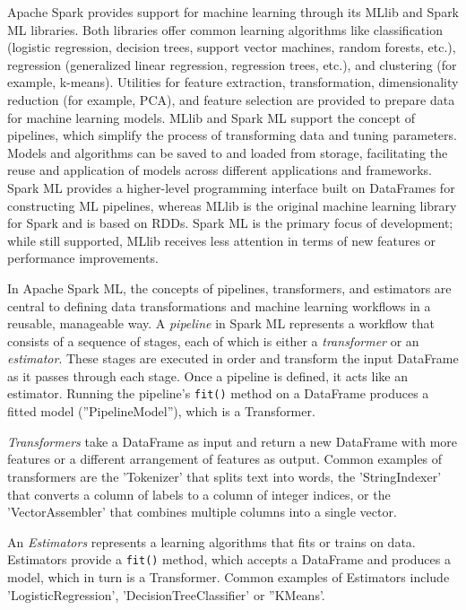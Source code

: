 Apache Spark provides support for machine learning through its MLlib and Spark ML libraries. Both libraries offer common learning algorithms like classification (logistic regression, decision trees, support vector machines, random forests, etc.), regression (generalized linear regression, regression trees, etc.), and clustering (for example, k-means). Utilities for feature extraction, transformation, dimensionality reduction (for example, PCA), and feature selection are provided to prepare data for machine learning models. MLlib and Spark ML support the concept of pipelines, which simplify the process of transforming data and tuning parameters. Models and algorithms can be saved to and loaded from storage, facilitating the reuse and application of models across different applications and frameworks. Spark ML provides a higher-level programming interface built on DataFrames for constructing ML pipelines, whereas MLlib is the original machine learning library for Spark and is based on RDDs. Spark ML is the primary focus of development; while still supported, MLlib receives less attention in terms of new features or performance improvements.

In Apache Spark ML, the concepts of pipelines, transformers, and estimators are central to defining data transformations and machine learning workflows in a reusable, manageable way. A \emph{pipeline} in Spark ML represents a workflow that consists of a sequence of stages, each of which is either a \emph{transformer} or an \emph{estimator}. These stages are executed in order and transform the input DataFrame as it passes through each stage. Once a pipeline is defined, it acts like an estimator. Running the pipeline's \texttt{fit()} method on a DataFrame produces a fitted model (''PipelineModel''), which is a Transformer.

\emph{Transformers} take a DataFrame as input and return a new DataFrame with more features or a different arrangement of features as output. Common examples of transformers are the 'Tokenizer' that splits text into words, the 'StringIndexer' that converts a column of labels to a column of integer indices, or the 'VectorAssembler' that combines multiple columns into a single vector.

An \emph{Estimators} represents a learning algorithms that fits or trains on data. Estimators provide a \texttt{fit()} method, which accepts a DataFrame and produces a model, which in turn is a Transformer. Common examples of Estimators include 'LogisticRegression', 'DecisionTreeClassifier' or ''KMeans'.

